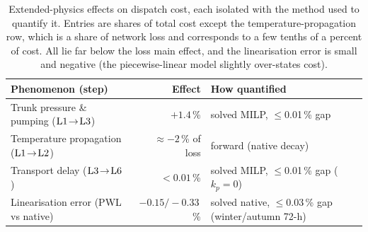 \begin{table}[t]
\centering
\caption{Extended-physics effects on dispatch cost, each isolated with the method used to
quantify it. Entries are shares of total cost except the temperature-propagation row, which is a
share of network loss and corresponds to a few tenths of a percent of cost. All lie far below the
loss main effect, and the linearisation error is small and negative (the piecewise-linear model
slightly over-states cost).}
\label{tab:linearisation}
\begin{tabular}{lrl}
\hline
Phenomenon (step) & Effect & How quantified \\
\hline
Trunk pressure \& pumping ($\mathrm{L1}\!\to\!\mathrm{L3}$) & $+1.4$\,\% & solved MILP, $\le$0.01\,\% gap \\
Temperature propagation ($\mathrm{L1}\!\to\!\mathrm{L2}$) & $\approx-2$\,\% of loss & forward (native decay) \\
Transport delay ($\mathrm{L3}\!\to\!\mathrm{L6}$) & $<0.01$\,\% & solved MILP, $\le$0.01\,\% gap ($k_p{=}0$) \\
Linearisation error (PWL vs native) & $-0.15/-0.33$\,\% & solved native, $\le$0.03\,\% gap (winter/autumn 72-h) \\
\hline
\end{tabular}
\end{table}